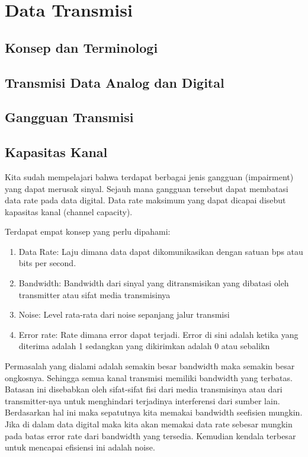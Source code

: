 \chapter{Data Transmisi}

\section{Konsep dan Terminologi}

\section{Transmisi Data Analog dan Digital}

\section{Gangguan Transmisi}

\section{Kapasitas Kanal}

Kita sudah mempelajari bahwa terdapat berbagai jenis gangguan (impairment) yang dapat merusak sinyal. Sejauh mana gangguan tersebut dapat membatasi data rate pada data digital. Data rate maksimum yang dapat dicapai disebut kapasitas kanal (channel capacity).

Terdapat empat konsep yang perlu dipahami:
\begin{enumerate}
	\item Data Rate: Laju dimana data dapat dikomunikasikan dengan satuan bps atau bits per second.
	\item Bandwidth: Bandwidth dari sinyal yang ditransmisikan yang dibatasi oleh transmitter atau sifat media transmisinya
	\item Noise: Level rata-rata dari noise sepanjang jalur transmisi
	\item Error rate: Rate dimana error dapat terjadi. Error di sini adalah ketika yang diterima adalah 1 sedangkan yang dikirimkan adalah 0 atau sebalikn
\end{enumerate}

Permasalah yang dialami adalah semakin besar bandwidth maka semakin besar ongkosnya. Sehingga semua kanal transmisi memiliki bandwidth yang terbatas. Batasan ini disebabkan oleh sifat-sifat fisi dari media transmisinya atau dari transmitter-nya untuk menghindari terjadinya interferensi dari sumber lain. Berdasarkan hal ini maka sepatutnya kita memakai bandwidth seefisien mungkin. Jika di dalam data digital maka kita akan memakai data rate sebesar mungkin pada batas error rate dari bandwidth yang tersedia. Kemudian kendala terbesar untuk mencapai efisiensi ini adalah noise.


